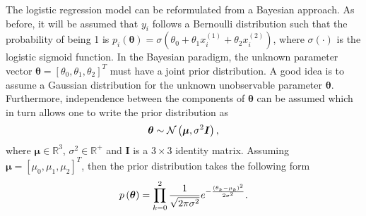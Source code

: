 
The logistic regression model can be reformulated from a Bayesian approach. As before, it will be assumed that $y_i$ follows a Bernoulli distribution such that the probability of being 1 is $p_i(\boldsymbol{\theta}) = \sigma(\theta_0 + \theta_1 x_i^{(1)} + \theta_2 x_i^{(2)})$, where $\sigma \left( \cdot \right)$ is the logistic sigmoid function. In the Bayesian paradigm, the unknown parameter vector $\boldsymbol{\boldsymbol{\theta}} = \left[ \theta_0, \theta_1, \theta_2 \right]^T$ must have a joint prior distribution. A good idea is to assume a Gaussian distribution for the unknown unobservable parameter $\boldsymbol{\boldsymbol{\theta}}$. Furthermore, independence between the components of $\boldsymbol{\boldsymbol{\theta}}$ can be assumed which in turn allows one to write the prior distribution as
\begin{equation}
  \boldsymbol{\theta} \sim \mathcal{N}\left( \boldsymbol{\mu}, \sigma^2 \boldsymbol{I} \right),
\end{equation}
where $\boldsymbol{\mu} \in \mathbb{R}^3$, $\sigma^2 \in \mathbb{R}^+$ and $\boldsymbol{I}$ is a $3 \times 3$ identity matrix.
Assuming $\boldsymbol{\mu} = \left[ \mu_0, \mu_1, \mu_2 \right]^T$, then the prior distribution takes the following form
\begin{equation}
  p\left( \boldsymbol{\theta} \right) = \prod_{k = 0}^2 \frac{1}{\sqrt{2 \pi \sigma^2}} e^{- \frac{(\theta_k - \mu_k)^2}{2\sigma^2}}.
\end{equation}

